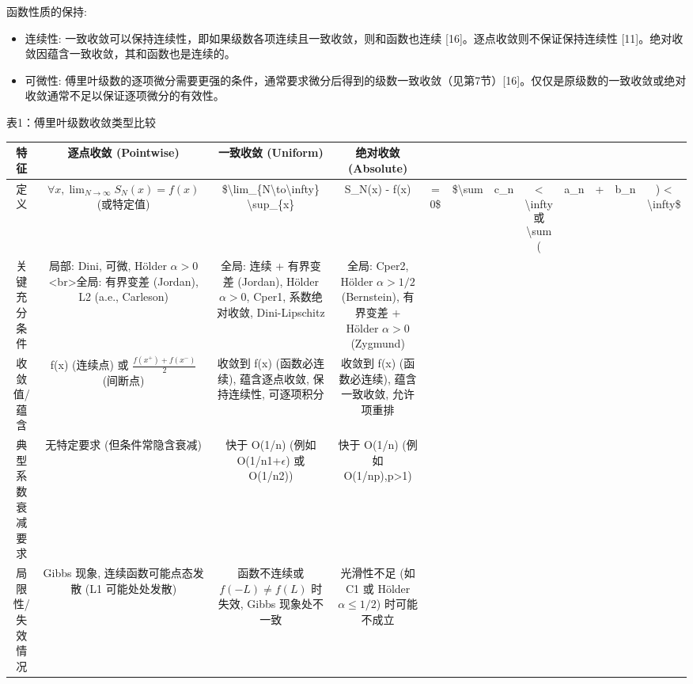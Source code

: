 函数性质的保持:

\begin{itemize}
	\item 连续性: 一致收敛可以保持连续性，即如果级数各项连续且一致收敛，则和函数也连续 [16]。逐点收敛则不保证保持连续性 [11]。绝对收敛因蕴含一致收敛，其和函数也是连续的。
	\item 可微性: 傅里叶级数的逐项微分需要更强的条件，通常要求微分后得到的级数一致收敛（见第7节）[16]。仅仅是原级数的一致收敛或绝对收敛通常不足以保证逐项微分的有效性。
\end{itemize}

表1：傅里叶级数收敛类型比较

\begin{table}[h]
	\centering
	\begin{tabular}{|c|c|c|c|c|c|c|c|c|c|c|c|}
		\hline
		特征 & 逐点收敛 (Pointwise) & 一致收敛 (Uniform) & 绝对收敛 (Absolute) &  &  &  &  &  &  &  &  \\
		\hline
		定义 & $\forall x,\lim_{N\to\infty}S_N(x)=f(x)$ (或特定值) & \$\textbackslash{}lim\_\{N\textbackslash{}to\textbackslash{}infty\} \textbackslash{}sup\_\{x\} & S\_N(x) - f(x) & = 0\$ & \$\textbackslash{}sum & c\_n & < \textbackslash{}infty\[
或
\]\textbackslash{}sum ( & a\_n & + & b\_n & ) < \textbackslash{}infty\$ \\
		\hline
		关键充分条件 & 局部: Dini, 可微, Hölder $\alpha>0$<br>全局: 有界变差 (Jordan), L2 (a.e., Carleson) & 全局: 连续 + 有界变差 (Jordan), Hölder $\alpha>0$, Cper1, 系数绝对收敛, Dini-Lipschitz & 全局: Cper2, Hölder $\alpha>1/2$ (Bernstein), 有界变差 + Hölder $\alpha>0$ (Zygmund) &  &  &  &  &  &  &  &  \\
		\hline
		收敛值/蕴含 & f(x) (连续点) 或 $\frac{f(x^+)+f(x^-)}{2}$ (间断点) & 收敛到 f(x) (函数必连续), 蕴含逐点收敛, 保持连续性, 可逐项积分 & 收敛到 f(x) (函数必连续), 蕴含一致收敛, 允许项重排 &  &  &  &  &  &  &  &  \\
		\hline
		典型系数衰减要求 & 无特定要求 (但条件常隐含衰减) & 快于 O(1/n) (例如 O(1/n1+$\epsilon$) 或 O(1/n2)) & 快于 O(1/n) (例如 O(1/np),p>1) &  &  &  &  &  &  &  &  \\
		\hline
		局限性/失效情况 & Gibbs 现象, 连续函数可能点态发散 (L1 可能处处发散) & 函数不连续或 $f(−L)\neq f(L)$ 时失效, Gibbs 现象处不一致 & 光滑性不足 (如 C1 或 Hölder $\alpha\leq1/2$) 时可能不成立 &  &  &  &  &  &  &  &  \\
		\hline
	\end{tabular}
\end{table}
